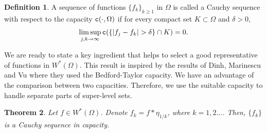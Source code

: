 \documentclass{amsart}
\newcommand{\de}{\delta}
\newcommand{\tc}{{\tt c}}
\newcommand{\Om}{\Omega}
\newtheorem{thm}{Theorem}
\theoremstyle{definition}
\newtheorem{defn}[thm]{Definition}
\numberwithin{thm}{section}
\numberwithin{equation}{section}
\renewcommand{\[}{\begin{equation}}
\renewcommand{\]}{\end{equation}}
\begin{document}
\begin{defn} A sequence of functions $\{f_k\}_{k\geq 1}$ in $\Om$ is called a Cauchy sequence with respect to the capacity $\tc(\cdot,\Om)$ if for every compact set $K\subset \Om$ and $\de>0$, 
$$
	\limsup_{j,k\to \infty} \tc( \{|f_j - f_k| >\de\} \cap K) =0.
$$
\end{defn}

We are ready to state a key ingredient that helps to select a good representative of functions in $W^*(\Om)$. This result is inspired by the results of Dinh, Marinescu and Vu \cite[Lemma~2.9, Theorem~2.10]{DMV} where they used the Bedford-Taylor capacity. We have an advantage of  the comparison between two capacities. Therefore, we use the suitable capacity to handle  separate parts of super-level sets.

\begin{thm}\label{thm:cap-cauchy} Let $f\in W^*(\Om)$.  Denote $f_k= f* \eta_{
1/k}$, where $k=1,2...$. Then, $\{f_k \}$ is a Cauchy sequence in capacity.
\end{thm}
\end{document}
